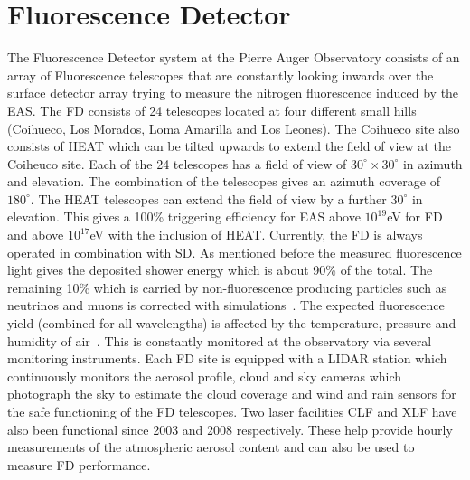 \section{Fluorescence Detector}
\label{sec:Fl_det}
The Fluorescence Detector system at the Pierre Auger Observatory consists of an array of Fluorescence telescopes that are constantly looking inwards over the surface detector array trying to measure the nitrogen fluorescence induced by the EAS. The FD consists of 24 telescopes located at four different small hills (Coihueco, Los Morados, Loma Amarilla and Los Leones). The Coihueco site also consists of \gls{HEAT} which can be tilted upwards to extend the field of view at the Coiheuco site. Each of the 24 telescopes has a field of view of $30^{\circ} \times 30^{\circ}$ in azimuth and elevation. The combination of the telescopes gives an azimuth coverage of $180^{\circ}$. The HEAT telescopes can extend the field of view by a further $30^{\circ}$ in elevation. This gives a 100\% triggering efficiency for EAS above $10^{19}$eV for FD and above $10^{17}$eV with the inclusion of HEAT. Currently, the FD is always operated in combination with SD. As mentioned before the measured fluorescence light gives the deposited shower energy which is about 90\% of the total. The remaining 10\% which is carried by non-fluorescence producing particles such as neutrinos and muons is corrected with simulations~\cite{Abraham_2010_FD}. The expected fluorescence yield (combined for all wavelengths) is affected by the temperature, pressure and humidity of air~\cite{Rosado:2014bya}. This is constantly monitored at the observatory via several monitoring instruments. Each FD site is equipped with a LIDAR station which continuously monitors the aerosol profile, cloud and sky cameras which photograph the sky to estimate the cloud coverage and wind and rain sensors for the safe functioning of the FD telescopes. Two laser facilities \gls{CLF} and \gls{XLF} have also been functional since 2003 and 2008 respectively. These help provide hourly measurements of the atmospheric aerosol content and can also be used to measure FD performance. 




